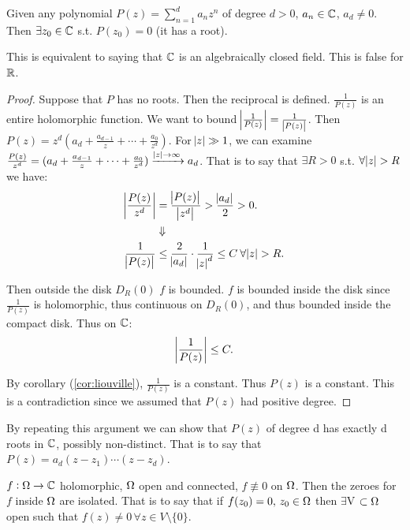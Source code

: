 \begin{corollary}
Given any polynomial $P(z) = \sum_{n=1}^{d} a_n z^n$ of degree $d> 0$, $a_n \in \mathbb{C} $, $a_d \neq 0$. Then $\exists z_0 \in \mathbb{C}$ s.t. $P(z_0) = 0$ (it has a root).
\end{corollary}

\begin{note}
This is equivalent to saying that $\mathbb{C}$ is an algebraically closed field. This is false for $\mathbb{R}$.
\end{note}


\begin{proof}
Suppose that $P$ has no roots. Then the reciprocal is defined. $\frac{1}{P(z)}$ is an entire holomorphic function. We want to bound $\abs{\frac{1}{P(z)}} = \frac{1}{\abs{P(z)}}$. Then $P(z) = z^d( a_d + \frac{a_{d-1}}{z} + \cdots + \frac{a_0}{z^d})$. For $\abs{z} \gg 1$, we can examine $\frac{P(z)}{z^d} = ( a_d + \frac{a_{d-1}}{z} + \cdots + \frac{a_0}{z^d}) \xrightarrow[]{\abs{z}\to \infty} a_d$. That is to say that $\exists R > 0 $ s.t. $\forall \abs{z} > R$ we have:
\begin{align*}
    \abs{\frac{P(z)}{z^d}} &= \frac{\abs{P(z)}}{\abs{z^d}} > \frac{\abs{a_d}}{2}>0.\\
    &\Downarrow\\
    \frac{1}{\abs{P(z)}} &\leq \frac{2}{\abs{a_d}} \cdot \frac{1}{\abs{z}^d} \leq C \: \forall \abs{z} > R.
\end{align*}
    
Then outside the disk $D_R(0)$ $f$ is bounded. $f$ is bounded inside the disk since $\frac{1}{P(z)}$ is holomorphic, thus continuous on $D_R(0)$, and thus bounded inside the compact disk. Thus on $\mathbb{C}$:
\begin{align*}
     \abs{\frac{1}{P(z)}} \leq C.
\end{align*}

By corollary (\ref{cor:liouville}), $\frac{1}{P(z)} $ is a constant. Thus $P(z)$ is a constant. This is a contradiction since we assumed that $P(z) $ had positive degree.
\end{proof} 

\begin{note}
By repeating this argument we can show that $P(z)$ of degree d has exactly d roots in $\mathbb{C}$, possibly non-distinct. That is to say that $P(z) = a_d (z-z_1)\cdots (z-z_d)$.
\end{note}


\begin{theorem}\label{thm:isolated-zeroes}

$f:\Omega \rightarrow \mathbb{C}$ holomorphic, $\Omega$ open and connected, $f \not\equiv 0$ on $\Omega$. Then the zeroes for $f$ inside $\Omega$ are isolated. That is to say that if $f(z_0)=0, \, z_0 \in \Omega$ then $\exists $V $\subset \Omega$ open such that $f(z) \neq 0 \, \forall z\in V \setminus \{0\}$.

\end{theorem}

